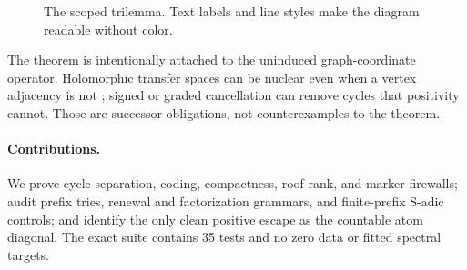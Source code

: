 \begin{figure}[t]
\centering

\caption{The scoped trilemma.  Text labels and line styles make the diagram
readable without color.}
\label{fig:trilemma}
\end{figure}

The theorem is intentionally attached to the uninduced graph-coordinate
operator.  Holomorphic transfer spaces can be nuclear even when a vertex
adjacency is not \citep{mayer1990}; signed or graded cancellation can remove
cycles that positivity cannot.  Those are successor obligations, not
counterexamples to the theorem.

\paragraph{Contributions.}
We prove cycle-separation, coding, compactness, roof-rank, and marker
firewalls; audit prefix tries, renewal and factorization grammars, and
finite-prefix S-adic controls; and identify the only clean positive escape
as the countable atom diagonal.  The exact suite contains 35 tests and no
zero data or fitted spectral targets.
